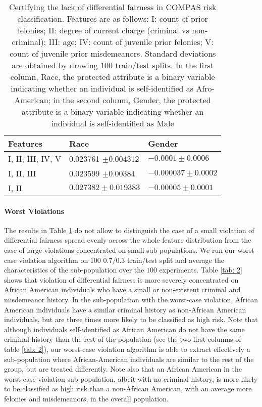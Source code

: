 \documentclass{article}
\begin{document}
\begin{table}[h!]
	\begin{tabular}{lll}
		Features & Race    & Gender  \\
		\hline
		I, II, III, IV, V         & 0.023761 $\pm 0.004312$ &   $-0.0001 \pm 0.0006$        \\
		I, II, III         & 0.023599 $\pm 0.00384$&     $-0.000037 \pm 0.0002$       \\
		I, II          & $0.027382 \pm 0.019383$ & $-0.00005 \pm 0.0001$         \\
		\hline 
	\end{tabular}
	\label{tab: 1}
	\caption{Certifying the lack of differential fairness in COMPAS risk classification. Features are as follows: I: count of prior felonies; II: degree of current charge (criminal vs non-criminal); III: age; IV: count of juvenile prior felonies; V: count of juvenile prior misdemeanors. Standard deviations are obtained by drawing $100$ train/test splits. In the first column, Race, the protected attribute is a binary variable indicating whether an individual is self-identified as Afro-American; in the second column, Gender, the protected attribute is a binary variable indicating whether an individual is self-identified as Male}
\end{table}

\paragraph{Worst Violations}
The results in Table \ref{tab: 1} do not allow to distinguish the case of a small violation of differential fairness spread evenly across the whole feature distribution from the case of large violations concentrated on small sub-populations. We run our worst-case violation algorithm on $100$ $0.7/0.3$ train/test split and average the characteristics of the sub-population over the $100$ experiments. Table \ref{tab: 2} shows that violation of differential fairness is more severely concentrated on African American individuals who have a small or non-existent criminal and misdemeanor history. In the sub-population with the worst-case violation, African American individuals have a similar criminal history as non-African American individuals, but are three times more likely to be classified as high risk. Note that although individuals self-identified as African American do not have the same criminal history than the rest of the population (see the two first columns of table \ref{tab: 2}), our worst-case violation algorithm is able to extract effectively a sub-population where African-American individuals are similar to the rest of the group, but are treated differently. Note also that an African American in the worst-case violation sub-population, albeit with no criminal history, is more likely to be classified as high risk than a non-African American, with an average more felonies and misdemeanors, in the overall population. 
\end{document}
